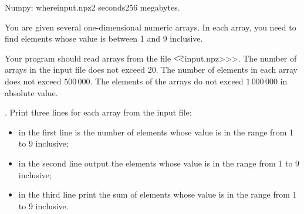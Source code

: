 \begin{problem}{Numpy: where}{input.npz}{}{2 seconds}{256 megabytes}.

You are given several one-dimensional numeric arrays. 
In each array, you need to find elements whose value is between 1 and 9 inclusive.

\InputFile
Your program should read arrays from the file {\t {<<input.npz>>>}}.
The number of arrays in the input file does not exceed 20.
The number of elements in each array does not exceed $500\,000$.
The elements of the arrays do not exceed $1\,000\,000$ in absolute value.

\OutputFile.
Print three lines for each array from the input file:
\begin{itemize} 
\item in the first line is the number of elements whose value is in the range from 1 to 9 inclusive;
\item in the second line output the elements whose value is in the range from 1 to 9 inclusive;
\item in the third line print the sum of elements whose value is in the range from 1 to 9 inclusive.
\end{itemize}


\Example
\begin{example}
%
\end{example}

\end{problem}

